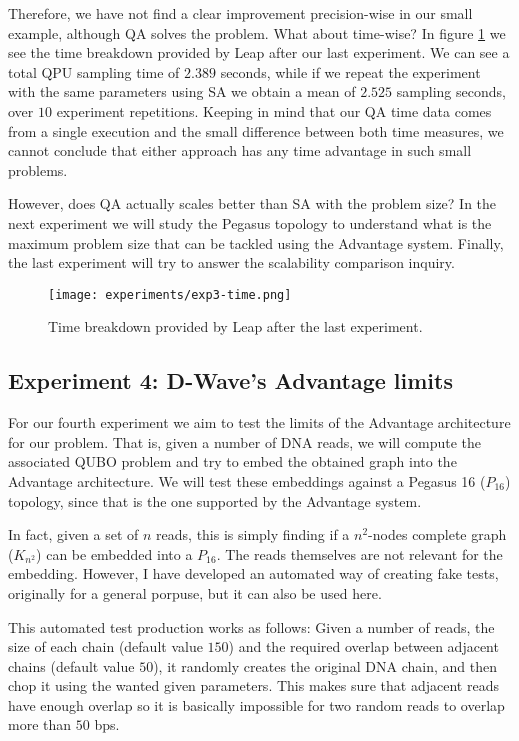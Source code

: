 Therefore, we have not find a clear improvement precision-wise in our small example, although QA solves the problem. What about time-wise? In figure \ref{fig:exp3-time} we see the time breakdown provided by Leap after our last experiment. We can see a total QPU sampling time of $2.389$ seconds, while if we repeat the experiment with the same parameters using SA we obtain a mean of $2.525$ sampling seconds, over $10$ experiment repetitions. Keeping in mind that our QA time data comes from a single execution and the small difference between both time measures, we cannot conclude that either approach has any time advantage in such small problems.

However, does QA actually scales better than SA with the problem size? In the next experiment we will study the Pegasus topology to understand what is the maximum problem size that can be tackled using the Advantage system. Finally, the last experiment will try to answer the scalability comparison inquiry.

\begin{figure}[h]
	\texttt{[image: experiments/exp3-time.png]}
	\centering
	\caption{Time breakdown provided by Leap after the last experiment.}
	\label{fig:exp3-time}
\end{figure}


\subsection{Experiment 4: D-Wave's Advantage limits}


For our fourth experiment we aim to test the limits of the Advantage architecture for our problem. That is, given a number of DNA reads, we will compute the associated QUBO problem and try to embed the obtained graph into the Advantage architecture. We will test these embeddings against a Pegasus 16 ($P_{16}$) topology, since that is the one supported by the Advantage system.

In fact, given a set of $n$ reads, this is simply finding if a $n^2$-nodes complete graph ($K_{n^2}$) can be embedded into a $P_{16}$. The reads themselves are not relevant for the embedding. However, I have developed an automated  way of creating fake tests, originally for a general porpuse, but it can also be used here.

This automated test production works as follows: Given a number of reads, the size of each chain (default value $150$) and the required overlap between adjacent chains (default value $50$), it randomly creates the original DNA chain, and then chop it using the wanted given parameters. This makes sure that adjacent reads have enough overlap so it is basically impossible for two random reads to overlap more than $50$ bps.

